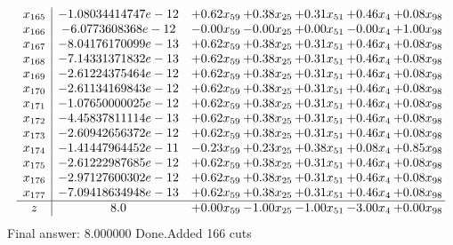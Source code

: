 \documentclass[8pt]{article}
\begin{document}
\[\begin{array}{c| c c@{\hskip 2pt} c@{\hskip 2pt} c@{\hskip 2pt} c@{\hskip 2pt} c@{\hskip 2pt} }
 x_{165}   &  -1.08034414747e-12 & +  0.62 x_{59} & +  0.38 x_{25} & +  0.31 x_{51} & +  0.46 x_{4} & +  0.08 x_{98}\\
 x_{166}   &  -6.0773608368e-12 & -0.00 x_{59} & -0.00 x_{25} & +  0.00 x_{51} & -0.00 x_{4} & +  1.00 x_{98}\\
 x_{167}   &  -8.04176170099e-13 & +  0.62 x_{59} & +  0.38 x_{25} & +  0.31 x_{51} & +  0.46 x_{4} & +  0.08 x_{98}\\
 x_{168}   &  -7.14331371832e-13 & +  0.62 x_{59} & +  0.38 x_{25} & +  0.31 x_{51} & +  0.46 x_{4} & +  0.08 x_{98}\\
 x_{169}   &  -2.61224375464e-12 & +  0.62 x_{59} & +  0.38 x_{25} & +  0.31 x_{51} & +  0.46 x_{4} & +  0.08 x_{98}\\
 x_{170}   &  -2.61134169843e-12 & +  0.62 x_{59} & +  0.38 x_{25} & +  0.31 x_{51} & +  0.46 x_{4} & +  0.08 x_{98}\\
 x_{171}   &  -1.07650000025e-12 & +  0.62 x_{59} & +  0.38 x_{25} & +  0.31 x_{51} & +  0.46 x_{4} & +  0.08 x_{98}\\
 x_{172}   &  -4.45837811114e-13 & +  0.62 x_{59} & +  0.38 x_{25} & +  0.31 x_{51} & +  0.46 x_{4} & +  0.08 x_{98}\\
 x_{173}   &  -2.60942656372e-12 & +  0.62 x_{59} & +  0.38 x_{25} & +  0.31 x_{51} & +  0.46 x_{4} & +  0.08 x_{98}\\
 x_{174}   &  -1.41447964452e-11 & -0.23 x_{59} & +  0.23 x_{25} & +  0.38 x_{51} & +  0.08 x_{4} & +  0.85 x_{98}\\
 x_{175}   &  -2.61222987685e-12 & +  0.62 x_{59} & +  0.38 x_{25} & +  0.31 x_{51} & +  0.46 x_{4} & +  0.08 x_{98}\\
 x_{176}   &  -2.97127600302e-12 & +  0.62 x_{59} & +  0.38 x_{25} & +  0.31 x_{51} & +  0.46 x_{4} & +  0.08 x_{98}\\
 x_{177}   &  -7.09418634948e-13 & +  0.62 x_{59} & +  0.38 x_{25} & +  0.31 x_{51} & +  0.46 x_{4} & +  0.08 x_{98}\\
\hline
z    &  8.0 & +  0.00 x_{59} & -1.00 x_{25} & -1.00 x_{51} & -3.00 x_{4} & +  0.00 x_{98}\\
\end{array}\]
 Final answer: 8.000000 
Done.Added 166 cuts 
\end{document}
